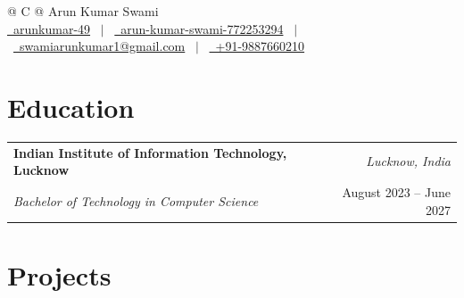 \documentclass[a4paper,11pt]{article}
\begin{document}
\pagestyle{empty}

\begin{tabularx}{\linewidth}{@{} C @{}}
\Huge{Arun Kumar Swami} \\[5pt]
\href{https://github.com/arunkumar-49}{\raisebox{-0.05\height}\faGithub\ arunkumar-49} \ $|$ \
\href{https://linkedin.com/in/arun-kumar-swami-772253294}{\raisebox{-0.05\height}\faLinkedin\ arun-kumar-swami-772253294} \ $|$ \
\href{mailto:swamiarunkumar1@gmail.com}{\raisebox{-0.05\height}\faEnvelope \ swamiarunkumar1@gmail.com} \ $|$ \
\href{tel:+919887660210}{\raisebox{-0.05\height}\faMobile \ +91-9887660210} \\
\end{tabularx}

\section{Education}
\begin{tabularx}{\linewidth}{@{}l X r@{}}
\textbf{Indian Institute of Information Technology, Lucknow} & & \textit{Lucknow, India} \\
\textit{Bachelor of Technology in Computer Science} & & August 2023 -- June 2027 \\
\end{tabularx}

\section{Projects}
\end{document}
